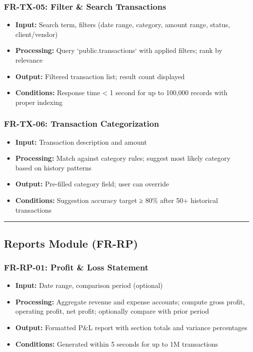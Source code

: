 \documentclass[journal, a4paper, onecolumn, 12pt]{IEEEtran}
\begin{document}
\subsubsection{FR-TX-05: Filter \& Search Transactions}
\begin{itemize}[leftmargin=*]
\item \textbf{Input:} Search term, filters (date range, category, amount range, status, client/vendor)
\item \textbf{Processing:} Query `public.transactions` with applied filters; rank by relevance
\item \textbf{Output:} Filtered transaction list; result count displayed
\item \textbf{Conditions:} Response time < 1 second for up to 100,000 records with proper indexing
\end{itemize}

\subsubsection{FR-TX-06: Transaction Categorization}
\begin{itemize}[leftmargin=*]
\item \textbf{Input:} Transaction description and amount
\item \textbf{Processing:} Match against category rules; suggest most likely category based on history patterns
\item \textbf{Output:} Pre-filled category field; user can override
\item \textbf{Conditions:} Suggestion accuracy target ≥ 80\% after 50+ historical transactions
\end{itemize}

\vspace{1em}\hrule\vspace{1em}

\subsection{Reports Module (FR-RP)}

\subsubsection{FR-RP-01: Profit \& Loss Statement}
\begin{itemize}[leftmargin=*]
\item \textbf{Input:} Date range, comparison period (optional)
\item \textbf{Processing:} Aggregate revenue and expense accounts; compute gross profit, operating profit, net profit; optionally compare with prior period
\item \textbf{Output:} Formatted P\&L report with section totals and variance percentages
\item \textbf{Conditions:} Generated within 5 seconds for up to 1M transactions
\end{itemize}
\end{document}
